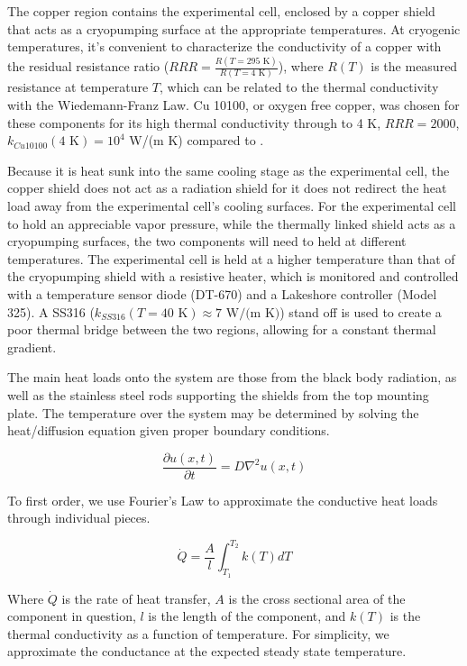 The copper region contains the experimental cell, enclosed by a copper shield that acts as a cryopumping surface at the appropriate temperatures. At cryogenic temperatures, it's convenient to characterize the conductivity of a copper with the residual resistance ratio ($RRR=\frac{R(T=295\text{ K})}{R(T=4\text{ K})}$), where $R(T)$ is the measured resistance at temperature $T$, which can be related to the thermal conductivity with the Wiedemann-Franz Law.\cite{White2009} Cu 10100, or oxygen free copper, was chosen for these components for its high thermal conductivity through to 4 K, $RRR=2000$, $k_{Cu10100}(4\text{ K}) = 10^4$ W/(m K) compared to \cite{NIST}.

Because it is heat sunk into the same cooling stage as the experimental cell, the copper shield does not act as a radiation shield for it does not redirect the heat load away from the experimental cell's cooling surfaces. For the experimental cell to hold an appreciable vapor pressure, while the thermally linked shield acts as a cryopumping surfaces, the two components will need to held at different temperatures. The experimental cell is held at a higher temperature than that of the cryopumping shield with a resistive heater, which is monitored and controlled with a temperature sensor diode (DT-670) and a Lakeshore controller (Model 325). A SS316 ($k_{SS316}(T=40\text{ K}) \approx 7\text{ W/(m K)}$) stand off is used to create a poor thermal bridge between the two regions, allowing for a constant thermal gradient.

The main heat loads onto the system are those from the black body radiation, as well as the stainless steel rods supporting the shields from the top mounting plate. The temperature over the system may be determined by solving the heat/diffusion equation given proper boundary conditions.

\begin{equation}
	\frac{\partial u(x, t)}{\partial t} = D \nabla^2 u(x, t)
\end{equation}

To first order, we use Fourier's Law to approximate the conductive heat loads through individual pieces.

\begin{equation}
	\dot{Q} = \frac{A}{l}\int_{T_1}^{T_2} k(T) dT
	\label{eq: fourier law}
\end{equation}

Where $\dot{Q}$ is the rate of heat transfer, $A$ is the cross sectional area of the component in question, $l$ is the length of the component, and $k(T)$ is the thermal conductivity as a function of temperature. For simplicity, we approximate the conductance at the expected steady state temperature.

